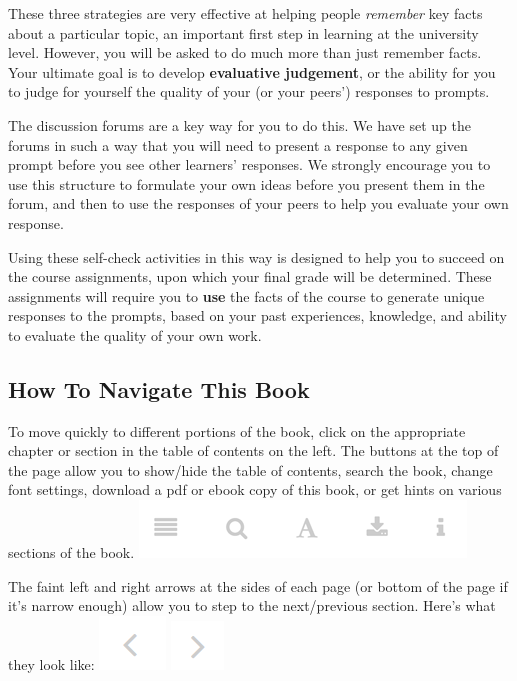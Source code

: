 \documentclass[
]{book}
\begin{document}
These three strategies are very effective at helping people \emph{remember} key facts about a particular topic, an important first step in learning at the university level. However, you will be asked to do much more than just remember facts. Your ultimate goal is to develop \textbf{evaluative judgement}, or the ability for you to judge for yourself the quality of your (or your peers') responses to prompts.

The discussion forums are a key way for you to do this. We have set up the forums in such a way that you will need to present a response to any given prompt before you see other learners' responses. We strongly encourage you to use this structure to formulate your own ideas before you present them in the forum, and then to use the responses of your peers to help you evaluate your own response.

Using these self-check activities in this way is designed to help you to succeed on the course assignments, upon which your final grade will be determined. These assignments will require you to \textbf{use} the facts of the course to generate unique responses to the prompts, based on your past experiences, knowledge, and ability to evaluate the quality of your own work.

\hypertarget{how-to-navigate-this-book}{%
\subsection*{How To Navigate This Book}\label{how-to-navigate-this-book}}

To move quickly to different portions of the book, click on the appropriate chapter or section in the table of contents on the left. The buttons at the top of the page allow you to show/hide the table of contents, search the book, change font settings, download a pdf or ebook copy of this book, or get hints on various sections of the book.
\includegraphics{assets/course-intro/menu.png}

The faint left and right arrows at the sides of each page (or bottom of the page if it's narrow enough) allow you to step to the next/previous section. Here's what they look like:
\includegraphics{assets/course-intro/left_arrow.png} \includegraphics{assets/course-intro/right_arrow.png}
\end{document}
